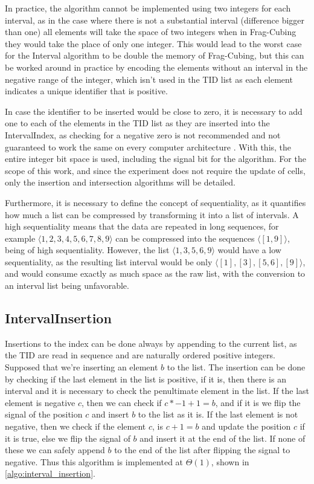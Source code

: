 In practice, the algorithm cannot be implemented using two integers for each interval, as in the case where there is not a substantial interval (difference bigger than one) all elements will take the space of two integers when in Frag-Cubing they would take the place of only one integer.
This would lead to the worst case for the Interval algorithm to be double the memory of Frag-Cubing, but this can be worked around in practice by encoding the elements without an interval in the negative range of the integer, which isn't used in the TID list as each element indicates a unique identifier that is positive.

In case the identifier to be inserted would be close to zero, it is necessary to add one to each of the elements in the TID list as they are inserted into the IntervalIndex, as checking for a negative zero is not recommended and not guaranteed to work the same on every computer architecture \cite{ieeeIEEEStandardFloatingPoint2019}.
With this, the entire integer bit space is used, including the signal bit for the algorithm.
For the scope of this work, and since the experiment does not require the update of cells, only the insertion and intersection algorithms will be detailed.

Furthermore, it is necessary to define the concept of sequentiality, as it quantifies how much a list can be compressed by transforming it into a list of intervals.
A high sequentiality means that the data are repeated in long sequences, for example $\langle 1, 2, 3, 4, 5, 6, 7, 8, 9 \rangle$ can be compressed into the sequences $\langle [1, 9] \rangle$, being of high sequentiality.
However, the list $\langle 1, 3, 5, 6, 9\rangle$ would have a low sequentiality, as the resulting list interval would be only $\langle [1], [3], [5, 6], [9] \rangle$, and would consume exactly as much space as the raw list, with the conversion to an interval list being unfavorable.

\subsection{IntervalInsertion}\label{ch:interval:algo:insertion}

Insertions to the index can be done always by appending to the current list, as the TID are read in sequence and are naturally ordered positive integers.
Supposed that we're inserting an element $b$ to the list.
The insertion can be done by checking if the last element in the list is positive, if it is, then there is an interval and it is necessary to check the penultimate element in the list.
If the last element is negative $c$, then we can check if $c * -1 + 1 = b$, and if it is we flip the signal of the position $c$ and insert $b$ to the list as it is.
If the last element is not negative, then we check if the element $c$, is $c + 1 = b$ and update the position $c$ if it is true, else we flip the signal of $b$ and insert it at the end of the list.
If none of these we can safely append $b$ to the end of the list after flipping the signal to negative.
Thus this algorithm is implemented at $\Theta(1)$, shown in \autoref{algo:interval_insertion}.

